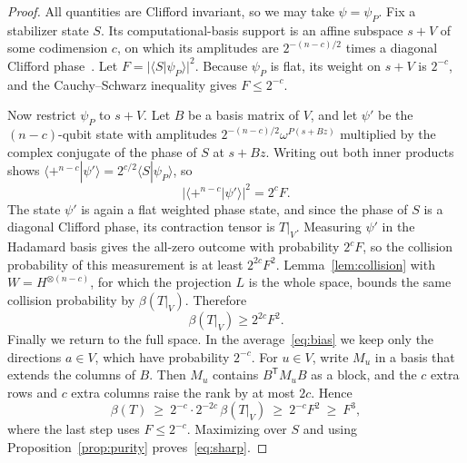 \documentclass[a4paper,onecolumn,11pt,unpublished]{quantumarticle}
\theoremstyle{plain}
\theoremstyle{remark}
\newcommand{\braket}[2]{\langle #1|#2\rangle}
\newcommand{\T}{\mathsf{T}}
\begin{document}
\begin{proof}
All quantities are Clifford invariant, so we may take $\psi=\psi_P$. Fix a stabilizer state $S$. Its computational-basis support is an affine subspace $s+V$ of some codimension $c$, on which its amplitudes are $2^{-(n-c)/2}$ times a diagonal Clifford phase~\cite{DD03}. Let $F=|\braket{S}{\psi_P}|^2$. Because $\psi_P$ is flat, its weight on $s+V$ is $2^{-c}$, and the Cauchy--Schwarz inequality gives $F\le 2^{-c}$.

Now restrict $\psi_P$ to $s+V$. Let $B$ be a basis matrix of $V$, and let $\psi'$ be the $(n-c)$-qubit state with amplitudes $2^{-(n-c)/2}\omega^{P(s+Bz)}$ multiplied by the complex conjugate of the phase of $S$ at $s+Bz$. Writing out both inner products shows $\braket{+^{n-c}}{\psi'}=2^{c/2}\braket{S}{\psi_P}$, so
\[
|\braket{+^{n-c}}{\psi'}|^2=2^cF .
\]
The state $\psi'$ is again a flat weighted phase state, and since the phase of $S$ is a diagonal Clifford phase, its contraction tensor is $T|_V$. Measuring $\psi'$ in the Hadamard basis gives the all-zero outcome with probability $2^cF$, so the collision probability of this measurement is at least $2^{2c}F^2$. Lemma~\ref{lem:collision} with $W=H^{\otimes(n-c)}$, for which the projection $L$ is the whole space, bounds the same collision probability by $\beta(T|_V)$. Therefore
\[
\beta(T|_V)\ge 2^{2c}F^2 .
\]
Finally we return to the full space. In the average~\eqref{eq:bias} we keep only the directions $a\in V$, which have probability $2^{-c}$. For $u\in V$, write $M_u$ in a basis that extends the columns of $B$. Then $M_u$ contains $B^\T M_uB$ as a block, and the $c$ extra rows and $c$ extra columns raise the rank by at most $2c$. Hence
\[
\beta(T)\ \ge\ 2^{-c}\cdot2^{-2c}\,\beta(T|_V)\ \ge\ 2^{-c}F^2\ \ge\ F^3,
\]
where the last step uses $F\le2^{-c}$. Maximizing over $S$ and using Proposition~\ref{prop:purity} proves~\eqref{eq:sharp}.


\end{proof}
\end{document}
